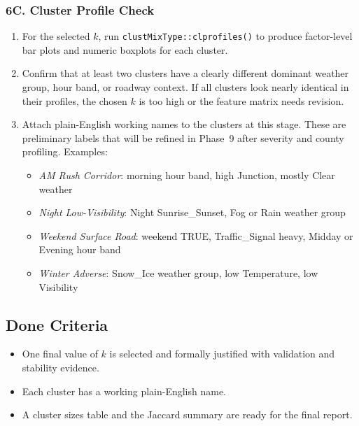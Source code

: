\documentclass[11pt]{article}
\begin{document}
\subsubsection*{6C. Cluster Profile Check}

\begin{enumerate}
  \item For the selected $k$, run \texttt{clustMixType::clprofiles()} to produce factor-level bar plots and numeric boxplots for each cluster.

  \item Confirm that at least two clusters have a clearly different dominant weather group, hour band, or roadway context. If all clusters look nearly identical in their profiles, the chosen $k$ is too high or the feature matrix needs revision.

  \item Attach plain-English working names to the clusters at this stage. These are preliminary labels that will be refined in Phase~9 after severity and county profiling. Examples:
  \begin{itemize}
    \item \textit{AM Rush Corridor}: morning hour band, high Junction, mostly Clear weather
    \item \textit{Night Low-Visibility}: Night Sunrise\_Sunset, Fog or Rain weather group
    \item \textit{Weekend Surface Road}: weekend TRUE, Traffic\_Signal heavy, Midday or Evening hour band
    \item \textit{Winter Adverse}: Snow\_Ice weather group, low Temperature, low Visibility
  \end{itemize}
\end{enumerate}

\subsection{Done Criteria}

\begin{itemize}
  \item One final value of $k$ is selected and formally justified with validation and stability evidence.
  \item Each cluster has a working plain-English name.
  \item A cluster sizes table and the Jaccard summary are ready for the final report.
\end{itemize}

\newpage
\end{document}

